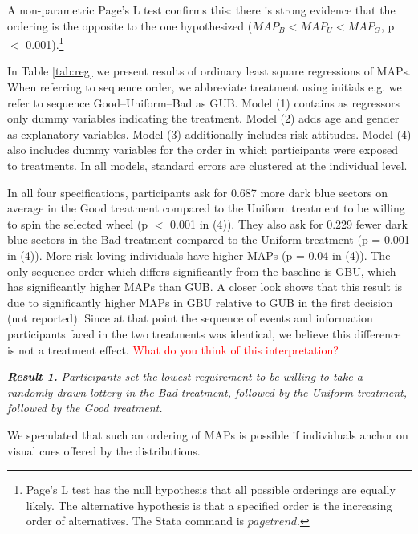 A non-parametric Page's L test confirms this: there is strong evidence that the ordering is the opposite to the one hypothesized ($MAP_B < MAP_U < MAP_G$, p $<$ 0.001).\footnote{
Page's L test has the null hypothesis that all possible orderings are equally likely.
The alternative hypothesis is that a specified order is the increasing order of alternatives.
The Stata command is $pagetrend$.
}

In Table \ref{tab:reg} we present results of ordinary least square regressions of MAPs.
When referring to sequence order, we abbreviate treatment using initials e.g. we refer to sequence Good--Uniform--Bad as GUB.
Model (1) contains as regressors only dummy variables indicating the treatment.
Model (2) adds age and gender as explanatory variables.
Model (3) additionally includes risk attitudes.
Model (4) also includes dummy variables for the order in which participants were exposed to treatments.
In all models, standard errors are clustered at the individual level.

In all four specifications, participants ask for 0.687 more dark blue sectors on average in the Good treatment compared to the Uniform treatment to be willing to spin the selected wheel (p $<$ 0.001 in (4)).
They also ask for 0.229 fewer dark blue sectors in the Bad treatment compared to the Uniform treatment (p = 0.001 in (4)).
More risk loving individuals have higher MAPs (p = 0.04 in (4)).
The only sequence order which differs significantly from the baseline is GBU, which has significantly higher MAPs than GUB.
A closer look shows that this result is due to significantly higher MAPs in GBU relative to GUB in the first decision (not reported).
Since at that point the sequence of events and information participants faced in the two treatments was identical, we believe this difference is not a treatment effect.
\textcolor{red}{What do you think of this interpretation?}

\textbf{\textit{Result 1.}} \textit{Participants set the lowest requirement to be willing to take a randomly drawn lottery in the Bad treatment, followed by the Uniform treatment, followed by the Good treatment.}

We speculated that such an ordering of MAPs is possible if individuals anchor on visual cues offered by the distributions.



